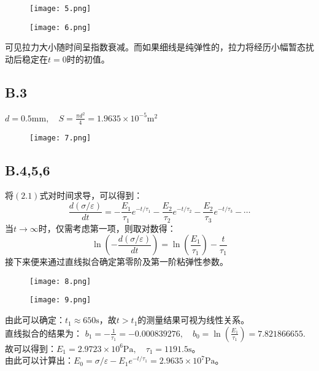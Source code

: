 \documentclass{ctexart}
\begin{document}
\begin{figure}[htbp]
  \centering
  \texttt{[image: 5.png]}
\end{figure}

\begin{figure}[htbp]
  \centering
  \texttt{[image: 6.png]}
\end{figure}
可见拉力大小随时间呈指数衰减。而如果细线是纯弹性的，拉力将经历小幅暂态扰动后稳定在$t=0$时的初值。

\subsection*{B.3}
\noindent $d=0.5\mathrm{mm}, \quad S=\frac{\pi d^2}{4}=1.9635\times10^{-5}\mathrm{m^2}$
\begin{figure}[htbp]
  \centering
  \texttt{[image: 7.png]}
\end{figure}
\subsection*{B.4,5,6}
将$(2.1)$式对时间求导，可以得到：
\begin{equation}
  \frac{d(\sigma/\varepsilon)}{dt}=-\frac{E_1}{\tau_1}e^{-t/\tau_1}-\frac{E_2}{\tau_2}e^{-t/\tau_2}-\frac{E_2}{\tau_3}e^{-t/\tau_3}-\cdots
\end{equation}
当$t\rightarrow\infty$时，仅需考虑第一项，则取对数得：
\begin{equation}
  \ln\left(-\frac{d(\sigma/\varepsilon)}{dt}\right)=\ln\left(\frac{E_1}{\tau_1}\right)-\frac{t}{\tau_1}
\end{equation}
接下来便来通过直线拟合确定第零阶及第一阶粘弹性参数。
\begin{figure}[htbp]
  \centering
  \texttt{[image: 8.png]}
\end{figure}
\begin{figure}[htbp]
  \centering
  \texttt{[image: 9.png]}
\end{figure}

\noindent 由此可以确定：$t_1\approx 650\mathrm{s}$，故$t>t_1$的测量结果可视为线性关系。\\
\noindent 直线拟合的结果为：
 $b_1=-\frac{1}{\tau_1}=-0.000839276,\quad b_0=\ln\left(\frac{E_1}{\tau_1}\right)=7.821866655.$\\
故可以得到：$E_1=2.9723\times10^6\mathrm{Pa},\quad \tau_1=1191.5\mathrm{s}$。\\
由此可以计算出：$E_0=\sigma/\varepsilon-E_1e^{-t/\tau_1}=2.9635\times10^7\mathrm{Pa}$。
\end{document}
